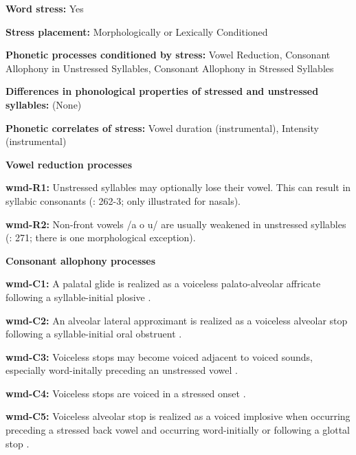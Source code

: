 \textbf{Word stress:} Yes



\textbf{Stress placement:} Morphologically or Lexically Conditioned



\textbf{Phonetic processes conditioned by stress:} Vowel Reduction, Consonant Allophony in Unstressed Syllables, Consonant Allophony in Stressed Syllables



\textbf{Differences in phonological properties of stressed and unstressed syllables:} (None)



\textbf{Phonetic correlates of stress:} Vowel duration (instrumental), Intensity (instrumental)



\textbf{Vowel reduction processes}



\textbf{wmd-R1:} Unstressed syllables may optionally lose their vowel. This can result in syllabic consonants (\citealt{Eberhard2009}: 262-3; only illustrated for nasals).



\textbf{wmd-R2:} Non-front vowels /a o u/ are usually weakened in unstressed syllables (\citealt{Eberhard2009}: 271; there is one morphological exception).



\textbf{Consonant allophony processes}



\textbf{wmd-C1:} A palatal glide is realized as a voiceless palato-alveolar affricate following a syllable-initial plosive \citep[94]{Eberhard2009}.



\textbf{wmd-C2:} An alveolar lateral approximant is realized as a voiceless alveolar stop following a syllable-initial oral obstruent \citep[92]{Eberhard2009}.



\textbf{wmd-C3:} Voiceless stops may become voiced adjacent to voiced sounds, especially word-initally preceding an unstressed vowel \citep{Eberhard2009}.



\textbf{wmd-C4:} Voiceless stops are voiced in a stressed onset \citep[55]{Eberhard2009}.



\textbf{wmd-C5:} Voiceless alveolar stop is realized as a voiced implosive when occurring preceding a stressed back vowel and occurring word-initially or following a glottal stop \citep[58]{Eberhard2009}.



